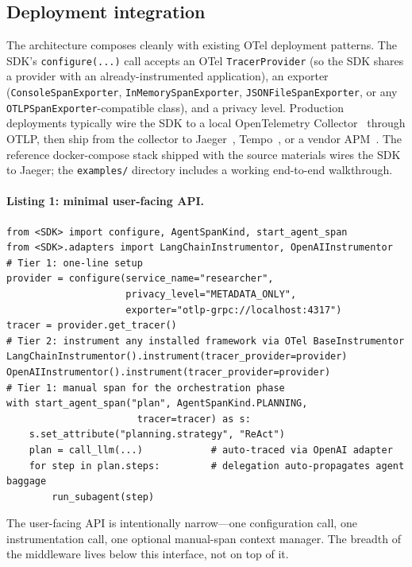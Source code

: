 \documentclass[sigconf,review,anonymous,9pt]{acmart}
\begin{document}
\subsection{Deployment integration}

The architecture composes cleanly with existing OTel deployment
patterns. The SDK's \texttt{configure(...)} call accepts an OTel
\texttt{TracerProvider} (so the SDK shares a provider with an
already-instrumented application), an exporter
(\texttt{ConsoleSpanExporter}, \texttt{InMemorySpanExporter},
\texttt{JSONFileSpanExporter}, or any
\texttt{OTLPSpanExporter}-compatible class), and a privacy level.
Production deployments typically wire the SDK to a local
OpenTelemetry Collector~\cite{otel} through OTLP, then ship from
the collector to Jaeger~\cite{jaeger}, Tempo~\cite{tempo}, or a
vendor APM~\cite{datadog_apm}. The reference docker-compose stack
shipped with the source materials wires the SDK to Jaeger; the
\texttt{examples/} directory includes a working end-to-end
walkthrough.

\paragraph{Listing 1: minimal user-facing API.}
\begin{lstlisting}[style=pyminimal]
from <SDK> import configure, AgentSpanKind, start_agent_span
from <SDK>.adapters import LangChainInstrumentor, OpenAIInstrumentor
# Tier 1: one-line setup
provider = configure(service_name="researcher",
                     privacy_level="METADATA_ONLY",
                     exporter="otlp-grpc://localhost:4317")
tracer = provider.get_tracer()
# Tier 2: instrument any installed framework via OTel BaseInstrumentor
LangChainInstrumentor().instrument(tracer_provider=provider)
OpenAIInstrumentor().instrument(tracer_provider=provider)
# Tier 1: manual span for the orchestration phase
with start_agent_span("plan", AgentSpanKind.PLANNING,
                       tracer=tracer) as s:
    s.set_attribute("planning.strategy", "ReAct")
    plan = call_llm(...)            # auto-traced via OpenAI adapter
    for step in plan.steps:         # delegation auto-propagates agent baggage
        run_subagent(step)
\end{lstlisting}

The user-facing API is intentionally narrow---one configuration call,
one instrumentation call, one optional manual-span context manager.
The breadth of the middleware lives below this interface, not on top
of it.
\end{document}
